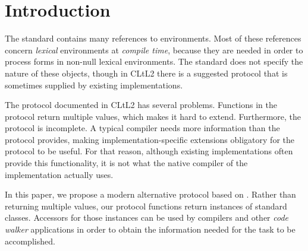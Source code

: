 \section{Introduction}

The \commonlisp{} standard \cite{ansi:common:lisp} contains many
references to environments.  Most of these references concern
\emph{lexical} environments at \emph{compile time}, because they are
needed in order to process forms in non-null lexical environments.
The standard does not specify the nature of these objects, though in
CLtL2 \cite{Steele:1990:CLL:95411} there is a suggested protocol that
is sometimes supplied by existing \commonlisp{} implementations.

The protocol documented in CLtL2 has several problems.  Functions in
the protocol return multiple values, which makes it hard to extend.
Furthermore, the protocol is incomplete.  A typical compiler needs
more information than the protocol provides, making
implementation-specific extensions obligatory for the protocol to be
useful.  For that reason, although existing \commonlisp{}
implementations often provide this functionality, it is not what the
native compiler of the implementation actually uses.

In this paper, we propose a modern alternative protocol based on
\clos{}.  Rather than returning multiple values, our protocol
functions return instances of standard classes.  Accessors for those
instances can be used by compilers and other \emph{code walker}
applications in order to obtain the information needed for the task to
be accomplished.


